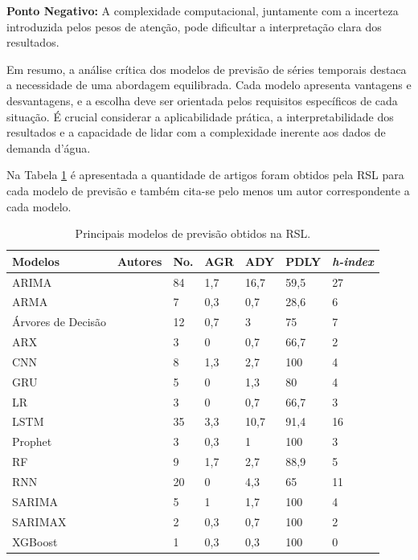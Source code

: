 \textbf{Ponto Negativo:} A complexidade computacional, juntamente com a incerteza introduzida pelos pesos de atenção, pode dificultar a interpretação clara dos resultados.

Em resumo, a análise crítica dos modelos de previsão de séries temporais destaca a necessidade de uma abordagem equilibrada. Cada modelo apresenta vantagens e desvantagens, e a escolha deve ser orientada pelos requisitos específicos de cada situação. É crucial considerar a aplicabilidade prática, a interpretabilidade dos resultados e a capacidade de lidar com a complexidade inerente aos dados de demanda d'água.

Na Tabela \ref{tb:mode} é apresentada a quantidade de artigos foram obtidos pela RSL para cada modelo de previsão e também cita-se pelo menos um autor correspondente a cada modelo.

\begin{table}[!htb]
	\centering
	\caption{Principais modelos de previsão obtidos na RSL.}\label{tb:mode}
	\small %
	\begin{tabular}{lllllll}
		\toprule
		Modelos & Autores & No. & AGR & ADY & PDLY & \textit{h-index} \\
		\midrule
		ARIMA & \citeonline{2-s2.0-85069459067} & 84 & 1,7 & 16,7 & 59,5 & 27 \\
		ARMA & \citeonline{2-s2.0-85038637324} & 7 & 0,3 & 0,7 & 28,6 & 6 \\
		Árvores de Decisão & \citeonline{2-s2.0-85054695177} & 12 & 0,7 & 3 & 75 & 7 \\
		ARX & \citeonline{2-s2.0-85051469381} & 3 & 0 & 0,7 & 66,7 & 2 \\	
		CNN & \citeonline{WOS:000841076700002} & 8 & 1,3 & 2,7 & 100 & 4 \\
		GRU & \citeonline{2-s2.0-85135210428} & 5 & 0 & 1,3 & 80 & 4 \\
		LR & \citeonline{2-s2.0-85125426780} & 3 & 0 & 0,7 & 66,7 & 3 \\
		LSTM & \citeonline{WOS:000529902300014} & 35 & 3,3 & 10,7 & 91,4 & 16 \\
		Prophet & \citeonline{2-s2.0-85092514286} & 3 & 0,3 & 1 & 100 & 3 \\
		RF & \citeonline{2-s2.0-85135210428} & 9 & 1,7 & 2,7 & 88,9 & 5 \\
		RNN & \citeonline{2-s2.0-85067419084} & 20 & 0 & 4,3 & 65 & 11 \\
		SARIMA & \citeonline{2-s2.0-85128561644} & 5 & 1 & 1,7 & 100 & 4 \\
		SARIMAX & \citeonline{2-s2.0-85099424908} & 2 & 0,3 & 0,7 & 100 & 2 \\	
		XGBoost & \citeonline{2-s2.0-85130441623} & 1 & 0,3 & 0,3 & 100 & 0 \\
		\bottomrule
	\end{tabular}
\end{table}

